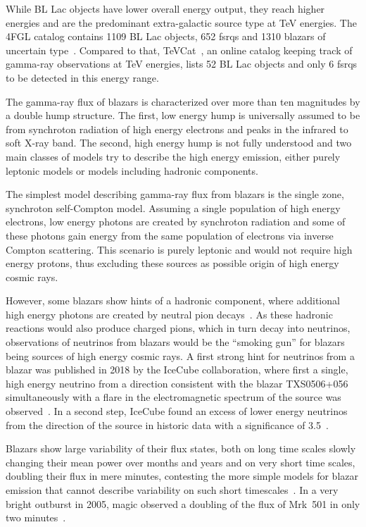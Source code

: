 While BL Lac objects have lower overall energy output, they reach
higher energies and are the predominant extra-galactic source type
at \si{\TeV} energies.
The 4FGL catalog contains 1109 BL Lac objects, 652 \glspl{fsrq} and 1310 blazars of
uncertain type~\cite{4fgl}.
Compared to that, TeVCat~\cite{tevcat},
an online catalog keeping track of gamma-ray observations at \si{\TeV} energies,
lists 52 BL Lac objects and only 6 \glspl{fsrq} to be detected in this energy range.

The gamma-ray flux of blazars is characterized over more than ten magnitudes
by a double hump structure. 
The first, low energy hump is universally assumed to be from synchroton radiation
of high energy electrons and peaks in the infrared to soft X-ray band.
The second, high energy hump is not fully understood and two main classes 
of models try to describe the high energy emission, either
purely leptonic models or models including hadronic components.

The simplest model describing gamma-ray flux from blazars is the single zone,
synchroton self-Compton model.
Assuming a single population of high energy electrons, low energy photons
are created by synchroton radiation and some of these photons gain energy
from the same population of electrons via inverse Compton scattering.
This scenario is purely leptonic and would not require high energy protons,
thus excluding these sources as possible origin of high energy cosmic rays.

However, some blazars show hints of a hadronic component, where additional
high energy photons are created by neutral pion decays~\cite{fromblazars}. 
As these hadronic reactions would also produce charged pions, which in turn
decay into neutrinos, observations of neutrinos from blazars would be the \enquote{smoking gun}
for blazars being sources of high energy cosmic rays.
A first strong hint for neutrinos from a blazar was published in 2018 by the
IceCube collaboration, where first a single, 
high energy neutrino from a direction consistent with the blazar TXS0506+056 
simultaneously with a flare in the electromagnetic spectrum of the source was observed~\cite{txs}.
In a second step, IceCube found an excess of lower energy neutrinos from the direction
of the source in historic data with a significance of \SI{3.5}{\sigma}~\cite{txs-historic}.

Blazars show large variability of their flux states,
both on long time scales slowly changing their mean power over months and years
and on very short time scales, doubling their flux in mere minutes, 
contesting the more simple models for blazar emission that cannot describe 
variability on such short timescales~\cite{fromblazars}.
In a very bright outburst in 2005, \gls{magic} observed a doubling of the flux of Mrk~501
in only two minutes~\cite{mrk501-variability}.


